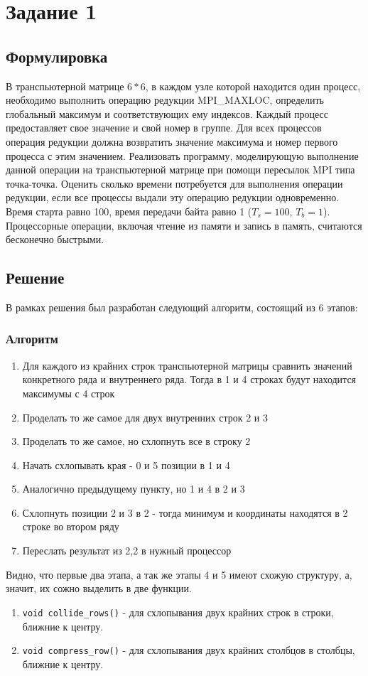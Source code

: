 \section*{Задание 1}
\subsection*{Формулировка}
В транспьютерной матрице $6*6$, в каждом узле которой находится один процесс, необходимо выполнить операцию редукции MPI\_MAXLOC, определить глобальный максимум и соответствующих ему индексов.
Каждый процесс предоставляет свое значение и свой номер в группе. Для всех процессов операция редукции должна возвратить значение максимума и номер первого процесса с этим значением.
Реализовать программу, моделирующую выполнение данной операции на транспьютерной матрице при помощи пересылок MPI типа точка-точка.
Оценить сколько времени потребуется для выполнения операции редукции, если все процессы выдали эту операцию редукции одновременно. Время старта равно 100, время передачи байта равно 1 ($T_s=100$, $T_b=1$). Процессорные операции, включая чтение из памяти и запись в память, считаются бесконечно быстрыми.
\subsection*{Решение}
В рамках решения был разработан следующий алгоритм, состоящий из 6 этапов:
\subsubsection*{Алгоритм}
\begin{enumerate}
    \item Для каждого из крайних строк транспьютерной матрицы сравнить значений конкретного ряда и внутреннего ряда. Тогда в 1 и 4 строках будут находится максимумы с 4 строк
    \item Проделать то же самое для двух внутренних строк 2 и 3
    \item Проделать то же самое, но схлопнуть все в строку 2
    \item Начать схлопывать края - 0 и 5 позиции в 1 и 4
    \item Аналогично предыдущему пункту, но 1 и 4 в 2 и 3
    \item Схлопнуть позиции 2 и 3 в 2 - тогда минимум и координаты находятся в 2 строке во втором ряду
    \item Переслать результат из 2,2 в нужный процессор
\end{enumerate}
Видно, что первые два этапа, а так же этапы 4 и 5 имеют схожую структуру, а, значит, их сожно выделить в две функции.
\begin{enumerate}
    \item \texttt{void collide_rows()} - для схлопывания двух крайних строк в строки, ближние к центру.
    \item \texttt{void compress_row()} - для схлопывания двух крайних столбцов в столбцы, ближние к центру.
\end{enumerate}

